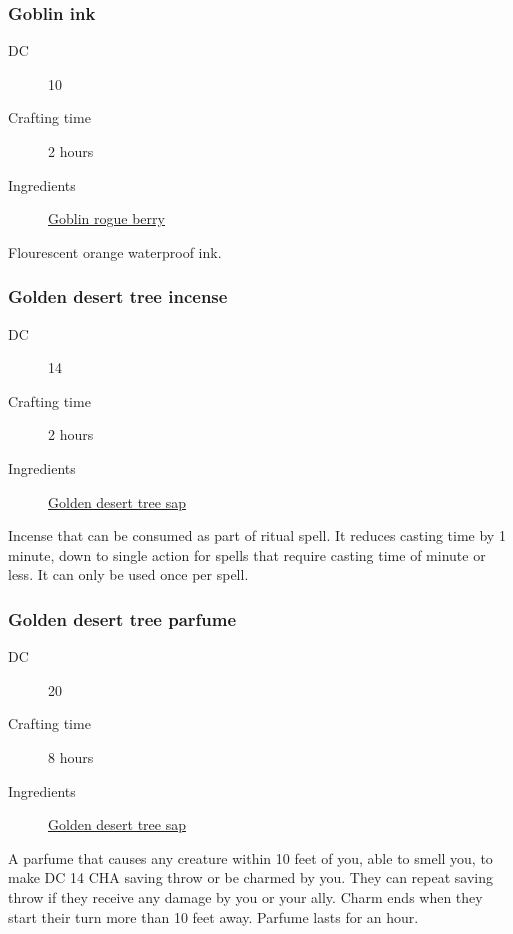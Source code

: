 \subsubsection{Goblin ink}
\label{Goblin ink}

\begin{description}
\item [DC] 10
\item [Crafting time] 2 hours
\item [Ingredients] \hyperref[Goblin Rogue]{Goblin rogue berry}
\end{description}

Flourescent orange waterproof ink.

\subsubsection{Golden desert tree incense}
\label{Golden desert tree incense}

\begin{description}
\item [DC] 14
\item [Crafting time] 2 hours
\item [Ingredients] \hyperref[Golden Desert Tree]{Golden desert tree sap}
\end{description}

Incense that can be consumed as part of ritual spell. It reduces casting time by 1 minute, down to single action for spells that require casting time of minute or less. It can only be used once per spell.

\subsubsection{Golden desert tree parfume}
\label{Golden desert tree parfume}

\begin{description}
\item [DC] 20
\item [Crafting time] 8 hours
\item [Ingredients] \hyperref[Golden Desert Tree]{Golden desert tree sap}
\end{description}

A parfume that causes any creature within 10 feet of you, able to smell you, to make DC 14 CHA
 saving throw or be charmed by you. They can repeat saving throw if they receive any damage by you 
 or your ally. Charm ends when they start their turn more than 10 feet away. Parfume lasts for an hour.

